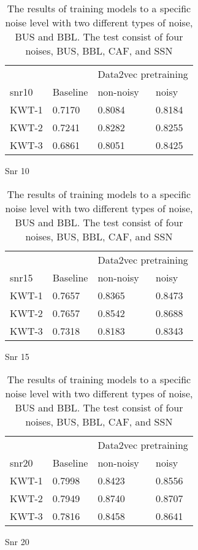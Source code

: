 \begin{table}[ht]
    \begin{subtable}[ht]{0.45\textwidth}
        \centering
        \begin{tabular}{@{}llll@{}}
        \toprule
        & & \multicolumn{2}{c}{Data2vec pretraining} \\ \cline{3-4}
        snr10    & Baseline & non-noisy & noisy \\ \midrule
        KWT-1    & 0.7170  & 0.8084 & 0.8184 \\
        KWT-2    & 0.7241  & 0.8282 & 0.8255 \\
        KWT-3    & 0.6861  & 0.8051 & 0.8425 \\
        \bottomrule
        \end{tabular}
        \caption{Snr 10}
    \end{subtable}
    \hfill
    \begin{subtable}[ht]{0.45\textwidth}
        \centering
        \begin{tabular}{@{}llll@{}}
        \toprule
        & & \multicolumn{2}{c}{Data2vec pretraining} \\ \cline{3-4}
        snr15    & Baseline & non-noisy & noisy \\ \midrule
        KWT-1    & 0.7657  & 0.8365 & 0.8473 \\
        KWT-2    & 0.7657  & 0.8542 & 0.8688 \\
        KWT-3    & 0.7318  & 0.8183 & 0.8343 \\
        \bottomrule
        \end{tabular}
        \caption{Snr 15}
    \end{subtable}

    
    \bigskip


    \begin{subtable}[ht]{0.45\textwidth}
        \centering
        \begin{tabular}{@{}llll@{}}
        \toprule
        & & \multicolumn{2}{c}{Data2vec pretraining} \\ \cline{3-4}
        snr20    & Baseline & non-noisy & noisy \\ \midrule
        KWT-1    & 0.7998  & 0.8423 & 0.8556 \\
        KWT-2    & 0.7949  & 0.8740 & 0.8707 \\
        KWT-3    & 0.7816  & 0.8458 & 0.8641 \\
        \bottomrule
        \end{tabular}
        \caption{Snr 20}
    \end{subtable}
    \caption{The results of training models to a specific noise level with two different types of noise, BUS and BBL. The test consist of four noises, BUS, BBL, CAF, and SSN}
    \label{tab:test_more_noise}
\end{table}
